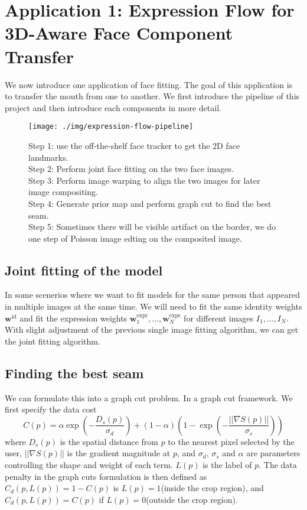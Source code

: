 
\section{Application 1: Expression Flow for 3D-Aware Face
Component Transfer}
We now introduce one application of face fitting. The goal of this application is to transfer the mouth from one to another. We first introduce the pipeline of this project and then introduce each components in more detail.
\begin{figure}[H]
\texttt{[image: ./img/expression-flow-pipeline]}
\caption{Step 1: use the off-the-shelf face tracker to get the 2D face landmarks. \\
Step 2: Perform joint face fitting on the two face images. \\
Step 3: Perform image warping to align the two images for later image compositing. \\
Step 4: Generate prior map and perform graph cut to find the best seam. \\
Step 5: Sometimes there will be visible artifact on the border, we do one step of Poisson image edting on the composited image.}
\end{figure}

\subsection{Joint fitting of the model}
In some scenerios where we want to fit models for the same person that appeared in multiple images at the same time. We will need to fit the same identity weights $\mathbf{w}^{\text{id}}$ and fit the expression weights $\mathbf{w}^{\text{expr}}_1, \dots, \mathbf{w}^{\text{expr}}_N$ for different images $I_1, \dots, I_N$. With slight adjustment of the previous single image fitting algorithm, we can get the joint fitting algorithm.

\subsection{Finding the best seam}
We can formulate this into a graph cut problem. In a graph cut framework. We first specify the data cost 
$$C(p) = \alpha \exp(-\frac{D_s(p)}{\sigma_d}) + (1 - \alpha) \left(1 - \exp(-\frac{||\nabla S(p)||}{\sigma_s})\right)$$
where $D_s(p)$ is the spatial distance from $p$ to the nearest pixel selected by the user, $||\nabla S(p)||$ is the gradient magnitude at $p$, and $\sigma_d$, $\sigma_s$ and $\alpha$ are parameters controlling the shape and weight of each term. $L(p)$ is the label of $p$. The data penalty in the graph cuts formulation is then defined as $C_d(p, L(p)) = 1 - C(p)$ is $L(p) = 1$(inside the crop region), and $C_d(p, L(p)) = C(p)$ if $L(p) = 0$(outside the crop region). 

